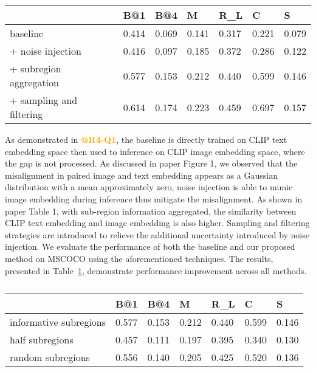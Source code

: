 \documentclass[letterpaper]{article} %
\begin{document}
\begin{table}[t]
\small
\centering
\tabcolsep=2pt
\begin{tabular}{l|llllll}
\hline
                            & B@1   & B@4   & M     & R\_L  & C     & S     \\ \hline
baseline                    & 0.414 & 0.069 & 0.141 & 0.317 & 0.221 & 0.079 \\ \hline
+ noise injection& 0.416 & 0.097 & 0.185 & 0.372 & 0.286 & 0.122 \\
+ subregion aggregation& 0.577 & 0.153 & 0.212 & 0.440 & 0.599 & 0.146 \\
+ sampling and filtering& 0.614 & 0.174 & 0.223 & 0.459 & 0.697 & 0.157 \\ \hline
\end{tabular}
\caption{}
\label{table:r2_abliation}
\end{table}
As demonstrated in \textbf{\textcolor{Orange}{@R4-Q1}}, the baseline is directly trained on CLIP text embedding space then used to inference on CLIP image embedding space, where the gap is not processed. As discussed in paper Figure 1, we observed that the misalignment in paired image and text embedding appears as a Gaussian distribution with a mean approximately zero, noise injection is able to mimic image embedding during inference thus mitigate the misalignment. As shown in paper Table 1, with sub-region information aggregated, the similarity between CLIP text embedding and image embedding is also higher. Sampling and filtering strategies are introduced to relieve the additional uncertainty introduced by noise injection. We evaluate the performance of both the baseline and our proposed method on MSCOCO using the aforementioned techniques. The results, presented in Table~\ref{table:r2_abliation}, demonstrate performance improvement across all methods.

\begin{table}[b]
\small
\centering
\tabcolsep=2pt
\begin{tabular}{l|llllll}
\hline
                       & B@1   & B@4   & M     & R\_L  & C     & S     \\ \hline
informative subregions & 0.577 & 0.153 & 0.212 & 0.440 & 0.599 & 0.146 \\
half subregions        & 0.457 & 0.111 & 0.197 & 0.395 & 0.340 & 0.130 \\
random subregions      & 0.556 & 0.140 & 0.205 & 0.425 & 0.520 & 0.136 \\ \hline
\end{tabular}
\caption{}
\label{table:subregions}
\end{table}
\end{document}

